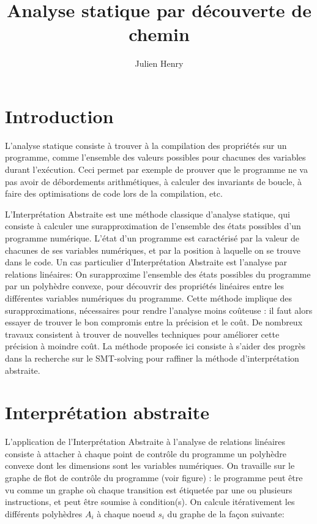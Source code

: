 \documentclass{llncs}
\title{Analyse statique par découverte de chemin}
\subtitle{}
\author{Julien Henry}
\institute{CNRS - Verimag \\ \email{Julien.Henry@imag.fr}}
\begin{document}
\maketitle

\section{Introduction}

L'analyse statique consiste à trouver à la compilation des propriétés sur un
programme, comme l'ensemble des valeurs possibles pour chacunes des
variables durant l'exécution. Ceci permet par exemple de prouver que le
programme ne va pas avoir de débordements arithmétiques, à calculer des
invariants de boucle, à faire des optimisations de code lors de la compilation, etc.

L'Interprétation Abstraite est une méthode classique d'analyse statique, qui consiste à calculer une surapproximation de
l'ensemble des états possibles d'un programme numérique. 
L'état d'un programme est caractérisé par la valeur de chacunes de ses variables
numériques, et par la position à laquelle on se trouve dans le code.
Un cas particulier
d'Interprétation Abstraite est l'analyse par relations linéaires: On surapproxime
l'ensemble des états possibles du programme par un polyhèdre convexe, pour découvrir des propriétés linéaires entre les différentes variables
numériques du programme.
Cette méthode implique des surapproximations, nécessaires pour rendre
l'analyse moins coûteuse : il faut alors essayer de
trouver le bon compromis entre la précision et le coût. De nombreux travaux
consistent à trouver de nouvelles techniques pour améliorer cette précision à
moindre coût. La méthode proposée ici consiste à s'aider des
progrès dans la recherche sur le SMT-solving
pour raffiner la méthode
d'interprétation abstraite.

\section{Interprétation abstraite}

L'application de l'Interprétation Abstraite à l'analyse de
relations linéaires consiste à attacher à chaque point de contrôle du programme un polyhèdre convexe dont les dimensions sont les variables numériques. On travaille sur
le graphe de flot de contrôle du programme (voir figure) : le programme peut
être vu comme un graphe où chaque transition est étiquetée par une ou plusieurs
instructions, et peut être soumise à condition(s). On calcule itérativement les
différents polyhèdres $A_i$ à chaque noeud $s_i$ du graphe de la façon suivante:
\end{document}
